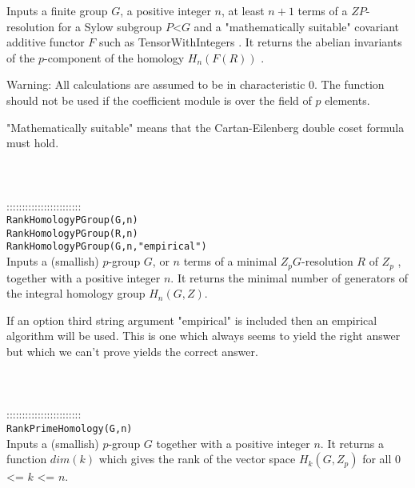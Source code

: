 \documentclass[a4paper,11pt]{report}
\begin{document}
{ Inputs a finite group $G$, a positive integer $n$, at least $n+1$ terms of a $ZP$-resolution for a Sylow subgroup $P${\textless}$G$ and a "mathematically suitable" covariant additive functor $F$ such as TensorWithIntegers . It returns the abelian invariants of the $p$-component of the homology $H_n(F(R))$ . 

 Warning: All calculations are assumed to be in characteristic 0. The function
should not be used if the coefficient module is over the field of $p$ elements. 

 "Mathematically suitable" means that the Cartan-Eilenberg double coset formula
must hold. \\
 \\
 \\
 \\
 ::::::::::::::::::::::::\\
 \texttt{RankHomologyPGroup(G,n)}\\
 \texttt{RankHomologyPGroup(R,n)}\\
 \texttt{RankHomologyPGroup(G,n,"empirical")}\\
 

 Inputs a (smallish) $p$-group $G$, or $n$ terms of a minimal $Z_pG$-resolution $R$ of $Z_p$ , together with a positive integer $n$. It returns the minimal number of generators of the integral homology group $H_n(G,Z)$. 

 If an option third string argument "empirical" is included then an empirical
algorithm will be used. This is one which always seems to yield the right
answer but which we can't prove yields the correct answer. \\
 \\
 \\
 \\
 ::::::::::::::::::::::::\\
 \texttt{RankPrimeHomology(G,n)}\\
 

 Inputs a (smallish) $p$-group $G$ together with a positive integer $n$. It returns a function $dim(k)$ which gives the rank of the vector space $H_k(G,Z_p)$ for all $0$ {\textless}= $k$ {\textless}= $n$. \\
 \\
 \\
 }

 
\end{document}
